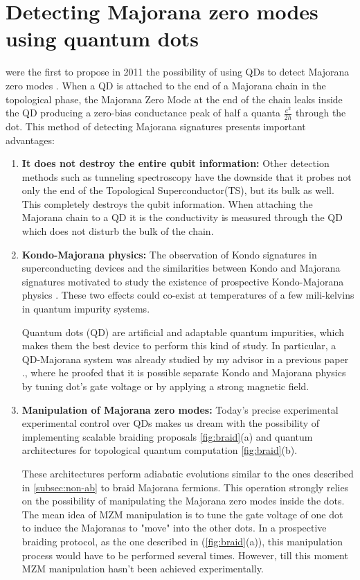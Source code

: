 \section{Detecting Majorana zero modes using quantum dots}

\citeauthor{liu_detecting_2011} were the first to propose in 2011 the possibility of using QDs to detect Majorana zero modes \cite{liu_detecting_2011} . When a QD is attached to the end of a Majorana chain in the topological phase,  the Majorana Zero Mode at the end of the chain leaks inside the QD \cite{vernek_subtle_2014} producing a zero-bias conductance peak of half a quanta $\frac{e^{2}}{2h}$ through the dot. This method of detecting Majorana signatures presents important advantages:

\begin{enumerate}
  \item \textbf{It does not destroy the entire qubit information:} Other detection methods such as tunneling spectroscopy have the downside that it probes not only the end of the Topological Superconductor(TS), but its bulk as well. This completely destroys the qubit information. When attaching the Majorana chain to a QD it is the conductivity is measured through the QD which does not disturb the bulk of the chain. 
  \item \textbf{Kondo-Majorana physics:} The observation of Kondo signatures in superconducting devices \cite{lee_zero-bias_2012} and the similarities between Kondo and Majorana signatures \cite{vernek_subtle_2014}  motivated to study the  existence of prospective Kondo-Majorana physics \cite{lee_kondo_2013,gorski_interplay_2018}. 
  These two effects could co-exist at temperatures of a few mili-kelvins in quantum impurity systems.

   Quantum dots (QD) are artificial and adaptable quantum impurities, which makes them the best device to perform this kind of study. In particular, a QD-Majorana system was already studied by my advisor in a previous paper \citep{ruiz-tijerina_interaction_2015}., where he proofed that it is possible separate Kondo and Majorana physics by tuning dot's gate voltage or by applying a strong magnetic field. 
  \item \textbf{Manipulation of Majorana zero modes:} Today's precise experimental experimental control over QDs makes us dream with the possibility of implementing scalable braiding proposals \ref{fig:braid}(a) and  quantum architectures for topological quantum computation \ref{fig:braid}(b). 

    These architectures perform adiabatic evolutions similar to the ones described in  \ref{subsec:non-ab} to braid Majorana fermions. This operation strongly relies on the possibility of manipulating the Majorana zero modes inside the dots. The mean idea of MZM manipulation is to  tune the gate voltage of one dot to induce the Majoranas to "move" into the other dots.  In a prospective braiding protocol, as the one described in  \cite{malciu_braiding_2018} (\ref{fig:braid}(a)), this manipulation process would have to be performed several times. However, till this moment MZM manipulation hasn't been achieved experimentally. 

\end{enumerate}

